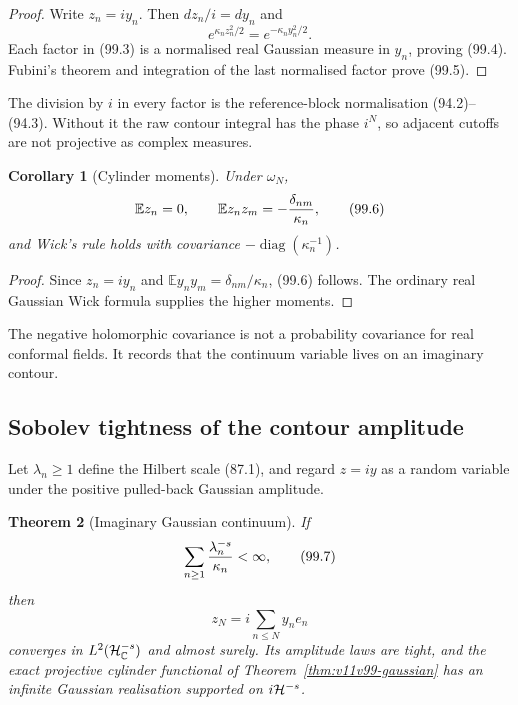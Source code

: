 \documentclass[11pt]{article}
\newtheorem{theorem}{Theorem}[section]
\newtheorem{corollary}[theorem]{Corollary}
\begin{document}
\begin{proof}
Write \(z_n=iy_n\).  Then \(dz_n/i=dy_n\) and
\[
 e^{\kappa_nz_n^2/2}=e^{-\kappa_ny_n^2/2}.
\]
Each factor in (99.3) is a normalised real Gaussian measure in
\(y_n\), proving (99.4).  Fubini's theorem and integration of the
last normalised factor prove (99.5).
\end{proof}

The division by \(i\) in every factor is the reference-block
normalisation (94.2)--(94.3).  Without it the raw contour integral has
the phase \(i^N\), so adjacent cutoffs are not projective as complex
measures.

\begin{corollary}[Cylinder moments]
\label{cor:v11v99-moments}
Under \(\omega_N\),
\[
 \mathbb E z_n=0,\qquad
 \mathbb E z_nz_m=-{\delta_{nm}\over\kappa_n},               \tag{99.6}
\]
and Wick's rule holds with covariance
\(-\operatorname{diag}(\kappa_n^{-1})\).
\end{corollary}

\begin{proof}
Since \(z_n=iy_n\) and
\(\mathbb E y_ny_m=\delta_{nm}/\kappa_n\), (99.6) follows.
The ordinary real Gaussian Wick formula supplies the higher moments.
\end{proof}

The negative holomorphic covariance is not a probability covariance
for real conformal fields.  It records that the continuum variable
lives on an imaginary contour.

\subsection{Sobolev tightness of the contour amplitude}

Let \(\lambda_n\ge1\) define the Hilbert scale (87.1), and regard
\(z=iy\) as a random variable under the positive pulled-back Gaussian
amplitude.

\begin{theorem}[Imaginary Gaussian continuum]
\label{thm:v11v99-tight}
If
\[
                              \sum_{n\ge1}
                              {\lambda_n^{-s}\over\kappa_n}
                              <\infty,                       \tag{99.7}
\]
then
\[
                              z_N=i\sum_{n\le N}y_ne_n       \tag{99.8}
\]
converges in \(L^2({\cal H}^{-s}_{\mathbb C})\) and almost surely.
Its amplitude laws are tight, and the exact projective cylinder
functional of Theorem~\ref{thm:v11v99-gaussian} has an infinite
Gaussian realisation supported on \(i{\cal H}^{-s}\).
\end{theorem}
\end{document}
